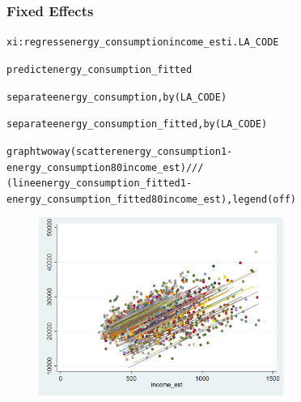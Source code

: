 \documentclass{beamer}
\begin{document}
  \begin{frame}
    \frametitle{Fixed Effects}
    \tiny
    \begin{alltt}
xi: regress energy\_consumption income\_est i.LA\_CODE

predict energy\_consumption\_fitted

separate energy\_consumption, by(LA\_CODE)

separate energy\_consumption\_fitted, by(LA\_CODE)

graph twoway (scatter energy\_consumption1-energy\_consumption80 income\_est) ///
	(line energy\_consumption\_fitted1-energy\_consumption\_fitted80 income\_est), legend(off) 
    \end{alltt}
    
    \begin{figure}
    \includegraphics[width=8cm]{../stata_code/fe.png}
    \centering
    \end{figure}
  \end{frame}
\end{document}
